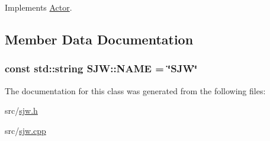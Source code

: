Implements \hyperlink{classActor_a1595ffb3d753120a9e74eac0bd69adf1}{Actor}.



\subsection{Member Data Documentation}
\subsubsection[{\texorpdfstring{N\+A\+ME}{NAME}}]{\setlength{\rightskip}{0pt plus 5cm}const std\+::string S\+J\+W\+::\+N\+A\+ME = \char`\"{}S\+JW\char`\"{}\hspace{0.3cm}{\ttfamily [static]}}\hypertarget{classSJW_a38d0a4a884536b96c3c9e7b5c32bf0fb}{}\label{classSJW_a38d0a4a884536b96c3c9e7b5c32bf0fb}


The documentation for this class was generated from the following files\+:\begin{DoxyCompactItemize}
\item 
src/\hyperlink{sjw_8h}{sjw.\+h}\item 
src/\hyperlink{sjw_8cpp}{sjw.\+cpp}\end{DoxyCompactItemize}

